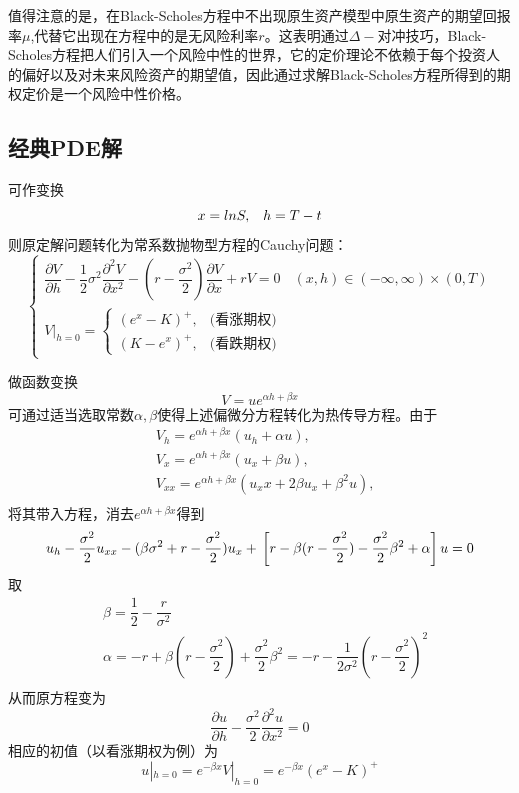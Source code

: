 \documentclass[UTF8，12pt]{ctexart}
\numberwithin{equation}{section}
\begin{document}
值得注意的是，在Black-Scholes方程中不出现原生资产模型中原生资产的期望回报率$\mu$,代替它出现在方程中的是无风险利率$r$。这表明通过$\Delta-$对冲技巧，Black-Scholes方程把人们引入一个风险中性的世界，它的定价理论不依赖于每个投资人的偏好以及对未来风险资产的期望值，因此通过求解Black-Scholes方程所得到的期权定价是一个风险中性价格。
\subsection{经典PDE解}

可作变换
\begin{equation}
	x=ln S,\hspace{0.3cm}h=T-t
\end{equation}
则原定解问题转化为常系数抛物型方程的Cauchy问题：
\[
\begin{cases}
	\dfrac{\partial V}{\partial h} - \dfrac{1}{2}\sigma^2 \dfrac{\partial^2 V}{\partial x^2} - (r-\dfrac{\sigma^2}{2})\dfrac{\partial V}{\partial x}+rV = 0 & (x,h)\in (-\infty,\infty)\times(0,T) \\[10pt]
	V|_{h=0} = 
	\begin{cases}
		(e^x - K)^+, & \text{(看涨期权)} \\
		(K - e^x)^+, & \text{(看跌期权)}
	\end{cases}
\end{cases}
\]

做函数变换
\begin{equation}
	V=ue^{\alpha h+\beta x}
\end{equation}
可通过适当选取常数$\alpha,\beta$使得上述偏微分方程转化为热传导方程。由于
\begin{equation}
	\begin{split}
		&V_h=e^{\alpha h+\beta x}(u_h+\alpha u),\\
		&V_x=e^{\alpha h+\beta x}(u_x+\beta u),\\
		&V_{xx}=e^{\alpha h+\beta x}(u_xx+2\beta u_x+\beta^2 u),\\
	\end{split}
\end{equation}
将其带入方程，消去$e^{\alpha h+\beta x}$得到
\begin{equation}
	u_h-\dfrac{\sigma^2}{2}u_{xx}-(\beta\sigma^2+r-\frac{\sigma^2}{2})u_x+\\\left[r-\beta(r-\dfrac{\sigma^2}{2})-\dfrac{\sigma^2}{2}\beta^2+\alpha\right]u=0
\end{equation}
取
\begin{equation}
	\begin{split}
		&\beta=\dfrac{1}{2}-\dfrac{r}{\sigma^2}\\
		&\alpha=-r+\beta(r-\dfrac{\sigma^2}{2})+\dfrac{\sigma^2}{2}\beta^2=-r-\dfrac{1}{2\sigma^2}(r-\dfrac{\sigma^2}{2})^2\\
	\end{split}
\end{equation}
从而原方程变为
\begin{equation}
	\dfrac{\partial u}{\partial h}-\dfrac{\sigma^2}{2}\dfrac{\partial^2 u}{\partial x^2}=0
\end{equation}
相应的初值（以看涨期权为例）为
\begin{equation}
	u|_{h=0}=e^{-\beta x}V|_{h=0}=e^{-\beta x}(e^x-K)^+
\end{equation}
\end{document}
